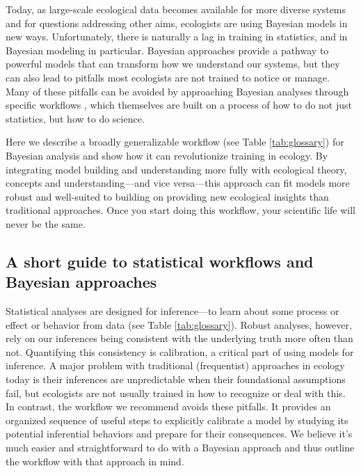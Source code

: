 \documentclass[11pt]{article}
\begin{document}
{Today, as large-scale ecological data becomes available for more diverse systems and for questions addressing other aims, ecologists are using Bayesian models in new ways. Unfortunately, there is naturally a lag in training in statistics, and in Bayesian modeling in particular. Bayesian approaches provide a pathway to powerful models that can transform how we understand our systems, but they can also lead to pitfalls most ecologists are not trained to notice or manage. Many of these pitfalls can be avoided by approaching Bayesian analyses through specific workflows \citep{betanworkflow,vandeschoot2021}, which themselves are built on a process of how to do not just statistics, but how to do science. %

Here we describe a broadly generalizable workflow (see Table \ref{tab:glossary}) for Bayesian analysis and show how it can revolutionize training in ecology. By integrating model building and understanding more fully with ecological theory, concepts and understanding---and vice versa---this approach can fit models more robust and well-suited to building on providing new ecological insights than traditional approaches. Once you start doing this workflow, your scientific life will never be the same. 
% 

\subsection{A short guide to statistical workflows and Bayesian approaches}
Statistical analyses are designed for inference---to learn about some process or effect or behavior from data  (see Table \ref{tab:glossary}). Robust analyses, however, rely on our inferences being consistent with the underlying truth more often than not.  Quantifying this consistency is calibration, a critical part of using models for inference. A major problem with traditional (frequentist) approaches in ecology today is their inferences are unpredictable when their foundational assumptions fail, but ecologists are not usually trained in how to recognize or deal with this. In contrast, the workflow we recommend avoids these pitfalls. It provides an organized sequence of useful steps to explicitly calibrate a model by studying its potential inferential behaviors and prepare for their consequences. We believe it's much easier and straightforward to do with a Bayesian approach and thus outline the workflow with that approach in mind. %

}
\end{document}
